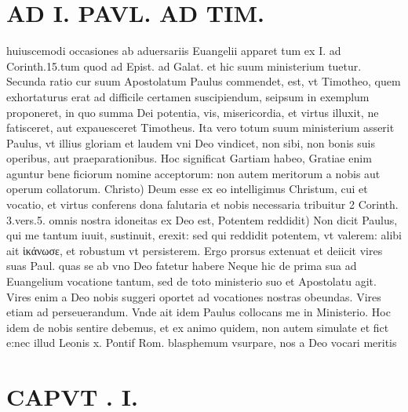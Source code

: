 \documentclass{article}
\begin{document}
\begin{pages}
\section*{AD I. PAVL. AD TIM. }
\marginpar{[ p.24 ]}\pstart huiuscemodi occasiones ab aduersariis Euangelii apparet tum ex I. ad Corinth.15.tum quod ad Epist. ad Galat. et hic suum ministerium tuetur. Secunda ratio cur suum Apostolatum Paulus commendet, est, vt Timotheo, quem exhortaturus erat ad difficile certamen suscipiendum, seipsum in exemplum proponeret, in quo summa Dei potentia, vis, misericordia, et virtus illuxit, ne fatisceret, aut expauesceret Timotheus. Ita vero totum suum ministerium asserit Paulus, vt illius gloriam et laudem vni Deo vindicet, non sibi, non bonis suis operibus, aut praeparationibus. Hoc significat Gartiam habeo, Gratiae enim aguntur bene ficiorum nomine acceptorum: non autem meritorum a nobis aut operum collatorum. Christo) Deum esse ex eo intelligimus Christum, cui et vocatio, et virtus conferens dona falutaria et nobis necessaria tribuitur 2 Corinth. 3.vers.5. omnis nostra idoneitas ex Deo est, Potentem reddidit) Non dicit Paulus, qui me tantum iuuit, sustinuit, erexit: sed qui reddidit potentem, vt valerem: alibi ait ἱκάνωσε, et robustum vt persisterem. Ergo prorsus extenuat et deiicit vires suas Paul. quas se ab vno Deo fatetur habere Neque hic de prima sua ad Euangelium vocatione tantum, sed de toto ministerio suo et Apostolatu agit. Vires enim a Deo nobis suggeri oportet ad vocationes nostras obeundas. Vires etiam ad perseuerandum. Vnde ait idem Paulus collocans me in Ministerio. Hoc idem de nobis sentire debemus, et ex animo quidem, non autem simulate et fict e:nec illud Leonis x. Pontif Rom. blasphemum vsurpare, nos a Deo vocari meritis  \pend
\section*{CAPVT . I. }
\marginpar{[ p.25 ]}\pstart {}
{}

\end{pages}
\end{document}
